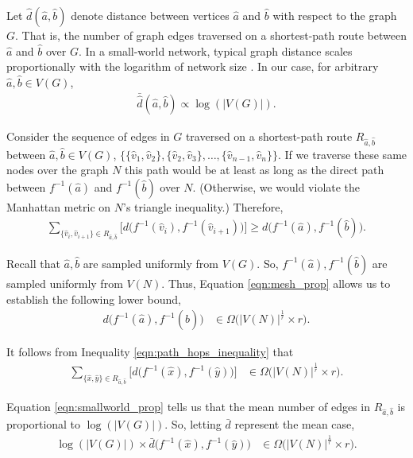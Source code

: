 Let $\hat{d}(\hat{a},\hat{b})$ denote distance between vertices $\hat{a}$ and $\hat{b}$ with respect to the graph $G$.
That is, the number of graph edges traversed on a shortest-path route between $\hat{a}$ and $\hat{b}$ over $G$.
In a small-world network, typical graph distance scales proportionally with the logarithm of network size .
In our case, for arbitrary $\hat{a},\hat{b} \in V(G)$,
\begin{align} \label{eqn:smallworld_prop}
\bar{\hat{d}}(\hat{a},\hat{b}) \propto \log(|V(G)|).
\end{align}

Consider the sequence of edges in $G$ traversed on a shortest-path route $R_{\hat{a},\hat{b}}$ between $\hat{a}, \hat{b} \in V(G)$, $\{\{\hat{v}_1, \hat{v}_2\}, \{\hat{v}_2, \hat{v}_3\}, \ldots, \{\hat{v}_{n-1}, \hat{v}_n\} \}$.
If we traverse these same nodes over the graph $N$ this path would be at least as long as the direct path between $f^{-1}(\hat{a})$ and $f^{-1}(\hat{b})$ over $N$.
(Otherwise, we would violate the Manhattan metric on $N$'s triangle inequality.)
Therefore,
\begin{align} \label{eqn:path_hops_inequality}
\sum_{\{\hat{v}_i, \hat{v}_{i+1}\} \in  R_{\hat{a},\hat{b}}}
\Big[ d\Big(f^{-1}(\hat{v}_i), f^{-1}(\hat{v}_{i+1})\Big) \Big]
\geq
d\Big(f^{-1}(\hat{a}), f^{-1}(\hat{b})\Big).
\end{align}

Recall that $\hat{a},\hat{b}$ are sampled uniformly from $V(G)$.
So, $f^{-1}(\hat{a}),f^{-1}(\hat{b})$ are sampled uniformly from $V(N)$.
Thus, Equation \ref{eqn:mesh_prop} allows us to establish the following lower bound,
\begin{align*}
d\Big(f^{-1}(\hat{a}), f^{-1}(\hat{b})\Big)
&\in
\Omega \Big(
  |V(N)|^{\frac{1}{r}} \times r
\Big).
\end{align*}

It follows from Inequality \ref{eqn:path_hops_inequality} that
\begin{align*}
\sum_{\{\hat{x}, \hat{y}\} \in  R_{\hat{a},\hat{b}}}
\Big[ d\Big(f^{-1}(\hat{x}), f^{-1}(\hat{y})\Big) \Big]
&\in
\Omega \Big(
  |V(N)|^{\frac{1}{r}} \times r
\Big).
\end{align*}

Equation \ref{eqn:smallworld_prop} tells us that the mean number of edges in $R_{\hat{a}, \hat{b}}$ is proportional to $\log(|V(G)|)$.
So, letting $\bar{d}$ represent the mean case,
\begin{align*}
\log(|V(G)|) \times \bar{d}\Big(f^{-1}(\hat{x}), f^{-1}(\hat{y})\Big)
&\in
\Omega \Big(
  |V(N)|^{\frac{1}{r}} \times r
\Big).
\end{align*}

